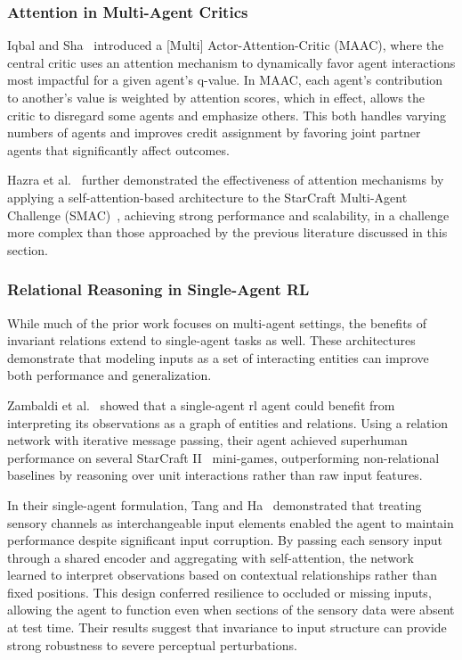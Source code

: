 \documentclass{article}
\begin{document}
\subsubsection{Attention in Multi-Agent Critics}
Iqbal and Sha~\cite{iqbal2019} introduced a [Multi] Actor-Attention-Critic (MAAC), 
where the central critic uses an attention mechanism to dynamically 
favor agent interactions most impactful for a given agent's \Gls{q}-value. 
In MAAC, each agent's contribution to another's value is weighted by attention scores, 
which in effect, allows the critic to disregard some agents and emphasize others. 
This both handles varying numbers of agents and improves credit assignment by 
favoring joint partner agents that significantly affect outcomes. 

Hazra et al.~\cite{hazra2024} further demonstrated the effectiveness 
of attention mechanisms by applying a self-attention-based architecture 
to the StarCraft Multi-Agent Challenge (SMAC)~\cite{samvelyan2019}, 
achieving strong performance and scalability,
in a challenge more complex than those approached by the previous 
literature discussed in this section.

\subsubsection{Relational Reasoning in Single-Agent RL}
While much of the prior work focuses on multi-agent settings, 
the benefits of invariant relations extend to single-agent tasks as well. 
These architectures demonstrate that modeling inputs as a set of 
interacting entities can improve both performance and generalization.

Zambaldi et al.~\cite{zambaldi2018} showed that a single-agent \gls{rl} agent could 
benefit from interpreting its observations as a graph of entities and relations. 
Using a relation network with iterative message passing, their agent achieved 
superhuman performance on several StarCraft II~\cite{vinyals2019} mini-games, 
outperforming non-relational baselines by reasoning over unit interactions 
rather than raw input features.

In their single-agent formulation, Tang and Ha~\cite{tang2021} demonstrated 
that treating sensory channels as interchangeable input elements enabled 
the agent to maintain performance despite significant input corruption. 
By passing each sensory input through a shared encoder and aggregating 
with self-attention, the network learned to interpret observations based 
on contextual relationships rather than fixed positions. 
This design conferred resilience to occluded or missing inputs, 
allowing the agent to function even when sections of the sensory 
data were absent at test time. Their results suggest that invariance 
to input structure can provide strong robustness to
severe perceptual perturbations.
\end{document}
